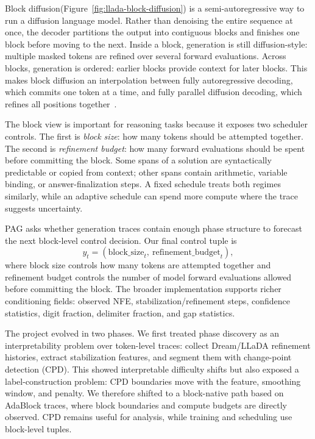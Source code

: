\documentclass[11pt]{article}
\newcommand{\pag}{PAG}
\newcommand{\nfe}{NFE}
\begin{document}
Block diffusion(Figure~\ref{fig:llada-block-diffusion}) is a semi-autoregressive way to run a diffusion language model. Rather than denoising the entire sequence at once, the decoder partitions the output into contiguous blocks and finishes one block before moving to the next. Inside a block, generation is still diffusion-style: multiple masked tokens are refined over several forward evaluations. Across blocks, generation is ordered: earlier blocks provide context for later blocks. This makes block diffusion an interpolation between fully autoregressive decoding, which commits one token at a time, and fully parallel diffusion decoding, which refines all positions together~\citep{arriola2025block}.

The block view is important for reasoning tasks because it exposes two scheduler controls. The first is \emph{block size}: how many tokens should be attempted together. The second is \emph{refinement budget}: how many forward evaluations should be spent before committing the block. Some spans of a solution are syntactically predictable or copied from context; other spans contain arithmetic, variable binding, or answer-finalization steps. A fixed schedule treats both regimes similarly, while an adaptive schedule can spend more compute where the trace suggests uncertainty.

\pag{} asks whether generation traces contain enough phase structure to forecast the next block-level control decision. Our final control tuple is
\[
  y_t = (\text{block\_size}_t,\ \text{refinement\_budget}_t),
\]
where block size controls how many tokens are attempted together and refinement budget controls the number of model forward evaluations allowed before committing the block. The broader implementation supports richer conditioning fields: observed \nfe{}, stabilization/refinement steps, confidence statistics, digit fraction, delimiter fraction, and gap statistics.

The project evolved in two phases. We first treated phase discovery as an interpretability problem over token-level traces: collect Dream/LLaDA refinement histories, extract stabilization features, and segment them with change-point detection (CPD). This showed interpretable difficulty shifts but also exposed a label-construction problem: CPD boundaries move with the feature, smoothing window, and penalty. We therefore shifted to a block-native path based on AdaBlock traces, where block boundaries and compute budgets are directly observed. CPD remains useful for analysis, while training and scheduling use block-level tuples.
\end{document}

